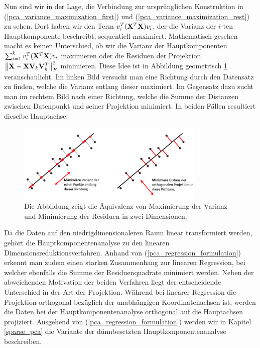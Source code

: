 Nun sind wir in der Lage, die Verbindung zur ursprünglichen Konstruktion in (\ref{pca_variance_maximization_first}) und (\ref{pca_variance_maximization_rest}) zu sehen. Dort haben wir den Term $v_i^T (\mathbf{X}^T \mathbf{X}) v_i$, der die Varianz der $i$-ten Hauptkomponente beschreibt, sequentiell maximiert. Mathematisch gesehen macht es keinen Unterschied, ob wir die Varianz der Hauptkomponenten $\sum_{i=1}^{k} v_i^T (\mathbf{X}^T \mathbf{X}) v_i$ maximieren oder die Residuen der Projektion $\left\lVert \mathbf{X} - \mathbf{X} \mathbf{V}_k \mathbf{V}_k^T \right\rVert_{F}^{2}$ minimieren. Diese Idee ist in Abbildung geometrisch \ref{pca_projection_explanation} veranschaulicht. Im linken Bild versucht man eine Richtung durch den Datensatz zu finden, welche die Varianz entlang dieser maximiert. Im Gegensatz dazu sucht man im rechtem Bild nach einer Richtung, welche die Summe der Distanzen zwischen Datenpunkt und seiner Projektion minimiert. In beiden Fällen resultiert dieselbe Hauptachse.

\begin{figure}
\centering
\includegraphics[width = 0.8\textwidth]{figures/pca_projection_explanation_german.png}
\caption{Die Abbildung zeigt die Äquivalenz von Maximierung der Varianz und Minimierung der Residuen in zwei Dimensionen.}
\label{pca_projection_explanation}
\end{figure} 


Da die Daten auf den niedrigdimensionaleren Raum linear transformiert werden, gehört die Hauptkomponentenanalyse zu den linearen Dimensionsreduktionsverfahren. Anhand von (\ref{pca_regression_formulation}) erkennt man zudem einen starken Zusammenhang zur linearen Regression, bei welcher ebenfalls die Summe der Residuenquadrate minimiert werden. Neben der abweichenden Motivation der beiden Verfahren liegt der entscheidende Unterschied in der Art der Projektion. Während bei linearer Regression die Projektion orthogonal bezüglich der unabhängigen Koordinatenachsen ist, werden die Daten bei der Hauptkomponentenanalyse orthogonal auf die Hauptachsen projiziert. Ausgehend von (\ref{pca_regression_formulation}) werden wir in Kapitel \ref{sparse_pca} die Variante der dünnbesetzten Hauptkomponentenanalyse beschreiben.

